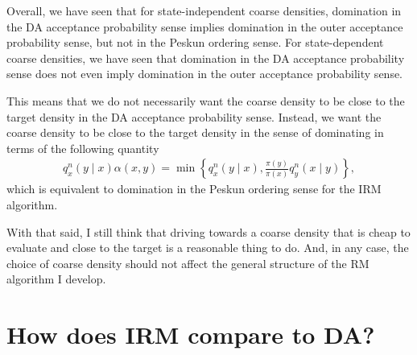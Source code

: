 \documentclass[12pt]{article}
\theoremstyle{definition}
\theoremstyle{remark}
\theoremstyle{plain}
\begin{document}
Overall, we have seen that for state-independent coarse densities, 
domination in the DA acceptance probability sense 
implies domination in the outer acceptance probability sense, but not 
in the Peskun ordering sense.
For state-dependent coarse densities, we have seen that domination in the DA acceptance probability sense 
does not even imply domination in the outer acceptance probability sense.

This means that we do not necessarily want the coarse density to be close to the target density 
in the DA acceptance probability sense. 
Instead, we want the coarse density to be close to the target density in the 
sense of dominating in terms of the following quantity
\begin{align*}
  q_{x}^{n}(y\mid x)\alpha(x,y)
  =
  \min\left\{
  q_{x}^{n}(y\mid x),
  \frac{\pi(y)}{\pi(x)}q_{y}^{n}(x\mid y)
  \right\},
\end{align*}
which is equivalent to domination in the Peskun ordering sense for the IRM algorithm.

With that said, I still think that driving towards a coarse density 
that is cheap to evaluate and close to the target is a reasonable thing to do.
And, in any case, the choice of coarse density should not 
affect the general structure of the RM algorithm I develop.


\section{How does IRM compare to DA?}
\end{document}
